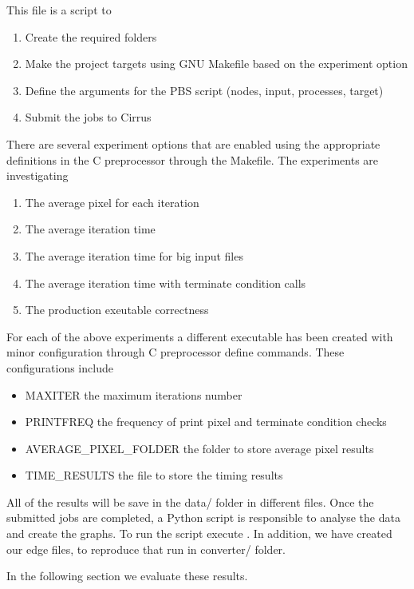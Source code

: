 \documentclass[12pt,a4paper]{article}
\begin{document}
	 This file is a script to
	\begin{enumerate}
    \item Create the required folders
    \item Make the project targets using GNU Makefile based on the experiment option
    \item Define the arguments for the PBS script (nodes, input, processes, target)
    \item Submit the jobs to Cirrus
	\end{enumerate}
	
  There are several experiment options that are enabled using the appropriate definitions in the C preprocessor through the Makefile. The experiments are investigating
  \begin{enumerate}
    \item The average pixel for each iteration
    \item The average iteration time
    \item The average iteration time for big input files
    \item The average iteration time with terminate condition calls
    \item The production exeutable correctness
  \end{enumerate}

	 For each of the above experiments a different executable has been created with minor configuration through C preprocessor define commands. These configurations include 
	
	\begin{itemize}
		\item MAXITER the maximum iterations number
		\item PRINTFREQ the frequency of print pixel and terminate condition checks
		\item AVERAGE\_PIXEL\_FOLDER the folder to store average pixel results
		\item TIME\_RESULTS the file to store the timing results
	\end{itemize}

	All of the results will be save in the data/ folder in different files. Once the submitted jobs are completed, a Python script is responsible to analyse the data and create the graphs. To run the script execute . In addition, we have created our edge files, to reproduce that run  in converter/ folder.
	
  	In the following section we evaluate these results.
  
\end{document}
